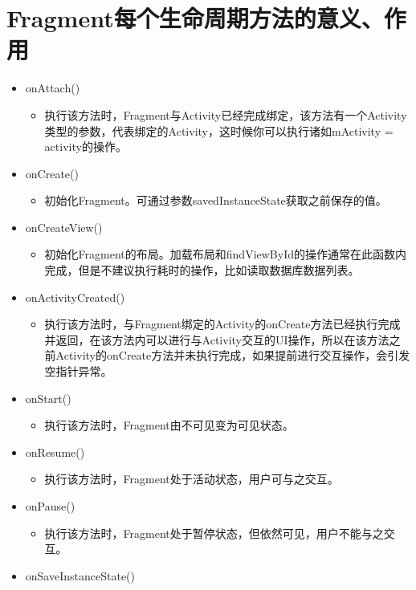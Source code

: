 \documentclass[9pt, b5paaper]{book}
\begin{document}
\section{Fragment每个生命周期方法的意义、作用}
\label{sec-2-3}
\begin{itemize}
\item onAttach()
\begin{itemize}
\item 执行该方法时，Fragment与Activity已经完成绑定，该方法有一个Activity类型的参数，代表绑定的Activity，这时候你可以执行诸如mActivity = activity的操作。
\end{itemize}
\item onCreate()
\begin{itemize}
\item 初始化Fragment。可通过参数savedInstanceState获取之前保存的值。
\end{itemize}
\item onCreateView()
\begin{itemize}
\item 初始化Fragment的布局。加载布局和findViewById的操作通常在此函数内完成，但是不建议执行耗时的操作，比如读取数据库数据列表。
\end{itemize}
\item onActivityCreated()
\begin{itemize}
\item 执行该方法时，与Fragment绑定的Activity的onCreate方法已经执行完成并返回，在该方法内可以进行与Activity交互的UI操作，所以在该方法之前Activity的onCreate方法并未执行完成，如果提前进行交互操作，会引发空指针异常。
\end{itemize}
\item onStart()
\begin{itemize}
\item 执行该方法时，Fragment由不可见变为可见状态。
\end{itemize}
\item onResume()
\begin{itemize}
\item 执行该方法时，Fragment处于活动状态，用户可与之交互。
\end{itemize}
\item onPause()
\begin{itemize}
\item 执行该方法时，Fragment处于暂停状态，但依然可见，用户不能与之交互。
\end{itemize}
\item onSaveInstanceState()
\begin{itemize}

\end{itemize}
\end{itemize}
\end{document}
